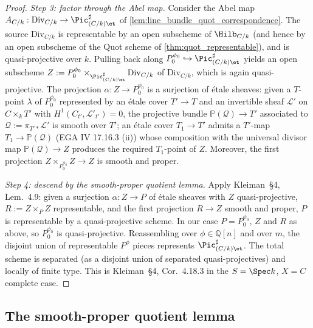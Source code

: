 \begin{proof}
  \emph{Step 3: factor through the Abel map.}
  Consider the Abel map \(A_{C/k} : \mathrm{Div}_{C/k} \to \Pic^\sharp_{(C/k)\et}\)
  of \cref{lem:line_bundle_quot_correspondence}. The source \(\mathrm{Div}_{C/k}\)
  is representable by an open subscheme of \(\Hilb_{C/k}\) (and hence by an
  open subscheme of the Quot scheme of \cref{thm:quot_representable}), and
  is quasi-projective over \(k\). Pulling back along
  \(P^{\phi_0}_0 \hookrightarrow \Pic^\sharp_{(C/k)\et}\) yields an open
  subscheme \(Z := P^{\phi_0}_0 \times_{\Pic^\sharp_{(C/k)\et}} \mathrm{Div}_{C/k}\)
  of \(\mathrm{Div}_{C/k}\), which is again quasi-projective. The projection
  \(\alpha : Z \to P^{\phi_0}_0\) is a surjection of \'etale sheaves:
  given a \(T\)-point \(\lambda\) of \(P^{\phi_0}_0\) represented by an \'etale
  cover \(T' \to T\) and an invertible sheaf \(\mathcal{L}'\) on \(C \times_k
  T'\) with \(H^1(C_{t'}, \mathcal{L}'_{t'}) = 0\), the projective bundle
  \(\mathbb{P}(\mathcal{Q}) \to T'\) associated to
  \(\mathcal{Q} := \pi_{T'*}\mathcal{L}'\) is smooth over \(T'\); an \'etale
  cover \(T_1 \to T'\) admits a \(T'\)-map \(T_1 \to \mathbb{P}(\mathcal{Q})\)
  (EGA IV 17.16.3 (ii)) whose composition with the universal divisor map
  \(\mathbb{P}(\mathcal{Q}) \to Z\) produces the required \(T_1\)-point of \(Z\).
  Moreover, the first projection \(Z \times_{P^{\phi_0}_0} Z \to Z\) is
  smooth and proper.

  \emph{Step 4: descend by the smooth-proper quotient lemma.}
  Apply Kleiman~\S 4, Lem.~4.9: given a surjection \(\alpha : Z \to P\)
  of \'etale sheaves with \(Z\) quasi-projective, \(R := Z \times_P Z\)
  representable, and the first projection \(R \to Z\) smooth and proper,
  \(P\) is representable by a quasi-projective scheme. In our case
  \(P = P^{\phi_0}_0\), \(Z\) and \(R\) as above, so \(P^{\phi_0}_0\) is
  quasi-projective. Reassembling over \(\phi \in \mathbb{Q}[n]\) and
  over \(m\), the disjoint union of representable \(P^\phi\) pieces represents
  \(\Pic^\sharp_{(C/k)\et}\). The total scheme is separated (as a disjoint
  union of separated quasi-projectives) and locally of finite type. This
  is Kleiman~\S 4, Cor.~4.18.3 in the \(S = \Spec k\),
  \(X = C\) complete case.
\end{proof}

\subsection{The smooth-proper quotient lemma}
\label{subsec:fga_pic_qt}

